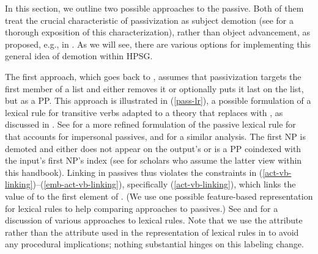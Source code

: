 \documentclass[output=paper
 	        ,biblatex
                ,babelshorthands
                ,newtxmath
                ,draftmode
                ,colorlinks, citecolor=brown
]{langscibook}
\begin{document}
In this section, we outline two possible approaches to 
the passive.  
Both of them treat the crucial characteristic of passivization as subject demotion (see \citealt{Blevins2003} for a thorough exposition of this characterization), rather than object advancement, as proposed, e.g., in  \citep{PerlmutterandPostal1983b}.
As we will see, there are various options for implementing this general idea of demotion within HPSG.

The first approach, which goes back to \citet[]{pollard+sag:1987}, assumes that passivization targets the first member of a  list and either removes it or optionally puts it last on the list, but as a PP.
This approach is illustrated in (\ref{pass-lr}), a possible formulation of a lexical rule for transitive verbs adapted to a theory that replaces  with \argst, as discussed in \citet[67]{Manning+Sag:1999}. 
See  for a  more refined formulation of the passive lexical rule for  that accounts for impersonal passives, and \citet{Blevins2003} for a similar analysis.
The first NP is demoted and either does not appear on the output's \argst or is a PP coindexed with the input's first NP's index (see  
for scholars who assume the latter view within this handbook).
Linking in passives thus violates the constraints in (\ref{act-vb-linking})--(\ref{emb-act-vb-linking}), specifically (\ref{act-vb-linking}), which links the value of  to the first element of \argst. (We use one possible feature-based representation for lexical rules to help comparing approaches to passives.) See \citet{Meurers2001} and  for a discussion of various approaches to lexical rules.
Note that we use the attribute  rather than the  attribute used in the
representation of lexical rules in \citet[76]{Meurers2001} to avoid any procedural
implications; nothing substantial hinges on this labeling change.
\end{document}

